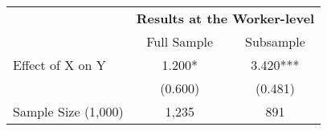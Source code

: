 \documentclass{article}
\begin{document}
\begin{tabular}{lcc}
\toprule
\midrule
\textbf{ } & \multicolumn{2}{c}{\textbf{Results at the Worker-level}} \\
  & Full Sample & Subsample\\
\cline{2-3}
Effect of X on Y & 1.200* & 3.420***\\
  & (0.600) & (0.481)\\
\midrule
Sample Size (1,000) & 1,235 & 891\\
\midrule
\bottomrule
\end{tabular}
\end{document}
